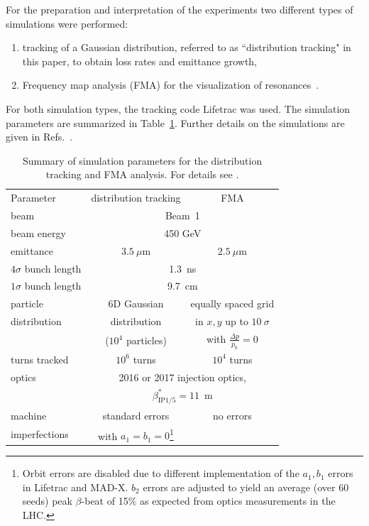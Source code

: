 \documentclass[%
 reprint,
 amsmath,amssymb,
 aps,
prstab,
longbibliography
]{revtex4-1}
\begin{document}
For the preparation and interpretation of the experiments two different types of simulations were performed:
\begin{enumerate}
	\item tracking of a Gaussian distribution, referred to as ``distribution tracking" in this paper, to obtain loss rates and emittance growth,
	\item Frequency map analysis (FMA) for the visualization of resonances~\cite{fmalaskar}.
\end{enumerate}
For both simulation types, the tracking code Lifetrac \cite{lifetrac} was used. The simulation parameters are summarized in Table~\ref{tab:sim_param}. Further details on the simulations are given in Refs.~\cite{md_sim_hel_res_ex_fitterer,resexmd2017}.
\begin{table}[h]
	\caption{\label{tab:sim_param}%
		Summary of simulation parameters for the distribution tracking and FMA analysis. For details see \cite{md_sim_hel_res_ex_fitterer,resexmd2017}.
	}
	\begin{ruledtabular}
		\begin{tabular}{lcc}
			Parameter & distribution tracking & FMA \\
			\colrule
			beam &\multicolumn{2}{c}{Beam~1} \\
			beam energy &\multicolumn{2}{c}{450 GeV} \\
			emittance & $3.5~\mu$m& $2.5~\mu$m\\
			$4\sigma$ bunch length & \multicolumn{2}{c}{1.3~ns}\\
			$1\sigma$ bunch length & \multicolumn{2}{c}{9.7~cm}\\
			particle & 6D Gaussian & equally spaced grid\\
			distribution &  distribution & in $x,y$ up to $10~\sigma$\\
			&  ($10^4$ particles) & with $\frac{\Delta p}{p_0}=0$\\
			turns tracked & $10^6$ turns & $10^4$ turns \\\hline
			optics & \multicolumn{2}{c}{2016 or 2017 injection optics,}\\
			& \multicolumn{2}{c}{$\beta_{\mathrm{IP1/5}}^*=11$~m}\\
			machine  & standard errors & no errors \\
			imperfections &with $a_1=b_1=0$\footnote{Orbit errors are disabled due to different implementation of the $a_1,b_1$ errors in Lifetrac and MAD-X. $b_2$ errors are adjusted to yield an average (over 60 seeds) peak $\beta$-beat of 15\% as expected from optics measurements in the LHC.} &  \\

\end{tabular}
\end{ruledtabular}
\end{table}
\end{document}
